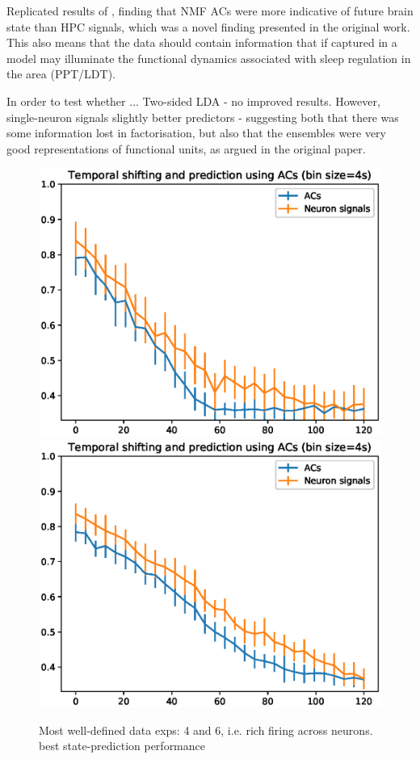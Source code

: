 \documentclass[mphil,deptreport,ianc]{infthesis} %
\begin{document}


Replicated results of \cite{Tsunematsu2019}, finding that NMF ACs were more indicative of future brain state than HPC signals, which was a novel finding presented in the original work.
This also means that the data should contain information that if captured in a model may illuminate the functional dynamics associated with sleep regulation in the area (PPT/LDT).

In order to test whether ...
Two-sided LDA - no improved results.
However, single-neuron signals slightly better predictors - suggesting both that there was some information lost in factorisation, but also that the ensembles were very good representations of functional units, as argued in the original paper.


\begin{figure}
    \centering
    \includegraphics[width=0.49\columnwidth]{figures/LDA/lda_temporal_shifting_and_prediction_bins_4_lda_acs_temporal_windows_4_exp_6.eps}
    \includegraphics[width=0.49\columnwidth]{figures/LDA/lda_temporal_shifting_and_prediction_bins_4_lda_acs_temporal_windows_4_exp_4.eps}
    \caption{Most well-defined data exps: 4 and 6, i.e. rich firing across neurons. best state-prediction performance}
\end{figure}
\end{document}
